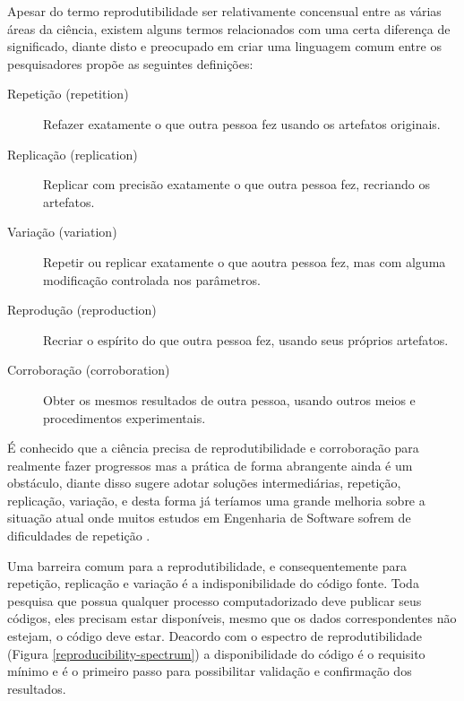 Apesar do termo reprodutibilidade ser relativamente concensual entre as várias
áreas da ciência, existem alguns termos relacionados com uma certa diferença
de significado, diante disto e preocupado em criar uma linguagem comum entre
os pesquisadores  propõe as seguintes definições:

\begin{description}

  \item[Repetição (repetition)]
  Refazer exatamente o que outra pessoa fez usando os artefatos originais.

  \item[Replicação (replication)]
  Replicar com precisão exatamente o que outra pessoa fez, recriando os
  artefatos.

  \item[Variação (variation)]
  Repetir ou replicar exatamente o que aoutra pessoa fez, mas com alguma
  modificação controlada nos parâmetros.

  \item[Reprodução (reproduction)]
  Recriar o espírito do que outra pessoa fez, usando seus próprios artefatos.

  \item[Corroboração (corroboration)]
  Obter os mesmos resultados de outra pessoa, usando outros meios e
  procedimentos experimentais.

\end{description}

É conhecido que a ciência precisa de reprodutibilidade e corroboração para
realmente fazer progressos mas a prática de forma abrangente ainda é um
obstáculo, diante disso  sugere adotar soluções
intermediárias, repetição, replicação, variação, e desta forma já teríamos uma
grande melhoria sobre a situação atual onde muitos estudos em Engenharia de
Software sofrem de dificuldades de repetição \cite{Tang2016}.

Uma barreira comum para a reprodutibilidade, e consequentemente para repetição,
replicação e variação é a indisponibilidade do código fonte. Toda pesquisa que
possua qualquer processo computadorizado deve publicar seus códigos, eles
precisam estar disponíveis, mesmo que os dados correspondentes não estejam, o
código deve estar. Deacordo com o espectro de reprodutibilidade (Figura
\ref{reproducibility-spectrum}) a disponibilidade do código é o requisito
mínimo e é o primeiro passo para possibilitar validação e confirmação dos
resultados.

